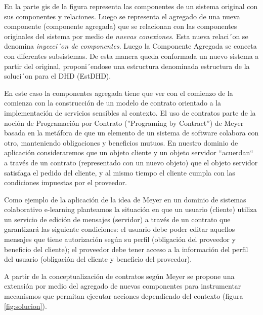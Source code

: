 En la parte gis de la figura representa las componentes de un sistema original
con sus componentes y relaciones. Luego se representa el agregado de una nueva
componente (componente agregada) que se relacionan con las componentes
originales del sistema por medio de \textit{nuevas conexiones}. Esta nueva
relaci´on se denomina \textit{inyecci´on de componentes}. Luego la Componente
Agregada se conecta con diferentes subsistemas. De esta manera queda conformada
un nuevo sistema a partir del original, proponi´endose una estructura
denominada estructura de la soluci´on para el DHD (EstDHD).

En este caso la componentes agregada tiene que ver con el comienzo de la
comienza con la construcción de un modelo de contrato orientado a la
implementación de servicios sensibles al contexto. El uso de contratos parte de
la noción de Programación por Contrato (”Programing by Contract”) de Meyer
\cite{cap1.11} basada en la metáfora de que un elemento de un sistema de
software colabora con otro, manteniendo obligaciones y beneficios mutuos. En
nuestro dominio de aplicación consideraremos que un objeto cliente y un objeto
servidor “acuerdan“ a través de un contrato (representado con un nuevo objeto)
que el objeto servidor satisfaga el pedido del cliente, y al mismo tiempo el
cliente cumpla con las condiciones impuestas por el proveedor.


Como ejemplo de la aplicación de la idea de Meyer en un dominio de
sistemas colaborativo e-learning planteamos la situación en que un
usuario (cliente) utiliza un servicio de edición de mensajes (servidor) a través
de un contrato que garantizará las siguiente condiciones: el usuario debe poder
editar aquellos mensajes que tiene autorización según su perfil (obligación del
proveedor y beneficio del cliente); el proveedor debe tener acceso a la
información del perfil del usuario (obligación del cliente y beneficio del
proveedor).


A partir de la conceptualización de contratos según Meyer se propone una
extensión por medio del agregado de nuevas componentes para instrumentar
mecanismos que permitan ejecutar acciones dependiendo del contexto (figura
\ref{fig:solucion}).

